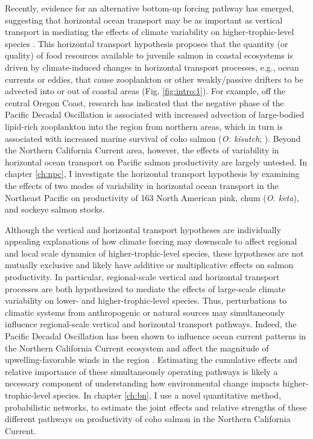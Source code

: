 Recently, evidence for an alternative bottom-up forcing pathway has emerged,
suggesting that horizontal ocean transport may be as important as vertical
transport in mediating the effects of climate variability on
higher-trophic-level species \citep{DiLorenzo2013b}. This horizontal transport
hypothesis proposes that the quantity (or quality) of food resources available
to juvenile salmon in coastal ecosystems is driven by climate-induced changes in
horizontal transport processes, e.g., ocean currents or eddies, that cause
zooplankton or other weakly/passive drifters to be advected into or out of
coastal areas (Fig. \ref{fig:intro:1}). For example, off the central Oregon
Coast, research has indicated that the negative phase of the Pacific Decadal
Oscillation is associated with increased advection of large-bodied lipid-rich
zooplankton into the region from northern areas, which in turn is associated
with increased marine survival of coho salmon (\emph{O. kisutch};
\citealp{Keister2011a, Bi2011a}). Beyond the Northern California Current area,
however, the effects of variability in horizontal ocean transport on Pacific
salmon productivity are largely untested. In chapter \ref{ch:npc}, I investigate
the horizontal transport hypothesis by examining the effects of two modes of
variability in horizontal ocean transport in the Northeast Pacific on
productivity of 163 North American pink, chum (\emph{O. keta}), and sockeye
salmon stocks.

Although the vertical and horizontal transport hypotheses are individually
appealing explanations of how climate forcing may downscale to affect regional
and local scale dynamics of higher-trophic-level species, these hypotheses are
not mutually exclusive and likely have additive or multiplicative effects on
salmon productivity. In particular, regional-scale vertical and horizontal
transport processes are both hypothesized to mediate the effects of large-scale
climate variability on lower- and higher-trophic-level species. Thus,
perturbations to climatic systems from anthropogenic or natural sources may
simultaneously influence regional-scale vertical and horizontal transport
pathways. Indeed, the Pacific Decadal Oscillation has been shown to influence
ocean current patterns in the Northern California Current ecosystem and affect
the magnitude of upwelling-favorable winds in the region \citep{Keister2011a,
Chhak2007}. Estimating the cumulative effects and relative importance of these
simultaneously operating pathways is likely a necessary component of
understanding how environmental change impacts higher-trophic-level species. In
chapter \ref{ch:bn}, I use a novel quantitative method, probabilistic networks,
to estimate the joint effects and relative strengths of these different pathways
on productivity of coho salmon in the Northern California Current.


